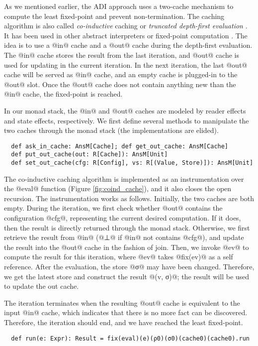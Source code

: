 As we mentioned earlier, the ADI approach uses a two-cache mechanism to
compute the least fixed-point and prevent non-termination.
The caching algorithm is also called \textit{co-inductive} caching or
\textit{truncated depth-first evaluation} \cite{Rosendahl:AbsIntPL}. It has
been used in other abstract interpreters or fixed-point computation
\cite{DBLP:journals/pacmpl/DaraisLNH17, Wei:2018:RAA:3243631.3236800,
  Rosendahl:AbsIntPL}. The idea is to use a @in@ cache and a @out@ cache during
the depth-first evaluation. The @in@ cache stores the result from the last
iteration, and @out@ cache is used for updating in the current iteration. In the next
iteration, the last @out@ cache will be served as @in@ cache, and an empty cache
is plugged-in to the @out@ slot. Once the @out@ cache does not contain anything
new than the @in@ cache, the fixed-point is reached.

In our monad stack, the @in@ and @out@ caches are modeled by reader effects and
state effects, respectively. We first define several methods to manipulate
the two caches through the monad stack (the implementations are elided).
\begin{lstlisting}
  def ask_in_cache: AnsM[Cache]; def get_out_cache: AnsM[Cache]
  def put_out_cache(out: R[Cache]): AnsM[Unit]
  def set_out_cache(cfg: R[Config], vs: R[(Value, Store)]): AnsM[Unit]
\end{lstlisting}

The co-inductive caching algorithm is implemented as an instrumentation over the
@eval@ function (Figure \ref{fig:coind_cache}), and it also closes the open recursion.
The instrumentation works as follows. Initially, the two caches are both empty.
During the iteration, we first check whether @out@ contains the configuration
@cfg@, representing the current desired computation. If it does, then the result
is directly returned through the monad stack.
Otherwise, we first retrieve the result from @in@ (@⊥@ if @in@ not contains
@cfg@), and update the result into the @out@ cache in the fashion of join.
Then, we invoke @ev@ to compute the result for this iteration, where @ev@ takes
@fix(ev)@ as a self reference.
After the evaluation, the store @σ@ may have been changed. Therefore, 
we get the latest store and construct the result @(v, σ)@; the
result will be used to update the out cache.

The iteration terminates when the resulting @out@ cache is equivalent to the
input @in@ cache, which indicates that there is no more fact can be discovered.
Therefore, the iteration should end, and we have reached the least fixed-point.
\begin{lstlisting}
  def run(e: Expr): Result = fix(eval)(e)(ρ0)(σ0)(cache0)(cache0).run
\end{lstlisting}

